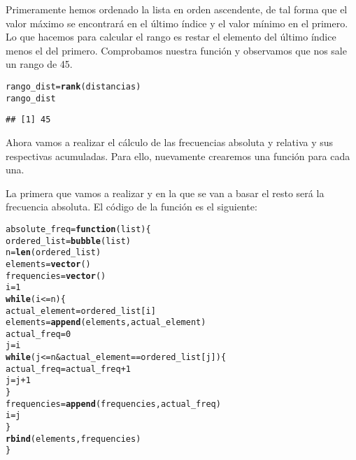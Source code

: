 \documentclass[12pt]{report}\usepackage[]{graphicx}\usepackage[dvipsnames]{xcolor}
\makeatletter
\newcommand{\hlnum}[1]{\textcolor[rgb]{0.686,0.059,0.569}{#1}}%
\newcommand{\hlopt}[1]{\textcolor[rgb]{0,0,0}{#1}}%
\newcommand{\hlstd}[1]{\textcolor[rgb]{0.345,0.345,0.345}{#1}}%
\newcommand{\hlkwa}[1]{\textcolor[rgb]{0.161,0.373,0.58}{\textbf{#1}}}%
\newcommand{\hlkwb}[1]{\textcolor[rgb]{0.69,0.353,0.396}{#1}}%
\newcommand{\hlkwc}[1]{\textcolor[rgb]{0.333,0.667,0.333}{#1}}%
\newcommand{\hlkwd}[1]{\textcolor[rgb]{0.737,0.353,0.396}{\textbf{#1}}}%
\newenvironment{kframe}{%
 \def\at@end@of@kframe{}%
 \ifinner\ifhmode%
  \def\at@end@of@kframe{\end{minipage}}%
  \begin{minipage}{\columnwidth}%
 \fi\fi%
 \def\FrameCommand##1{\hskip\@totalleftmargin \hskip-\fboxsep
 \colorbox{shadecolor}{##1}\hskip-\fboxsep
     \hskip-\linewidth \hskip-\@totalleftmargin \hskip\columnwidth}%
 \MakeFramed {\advance\hsize-\width
   \@totalleftmargin\z@ \linewidth\hsize
   \@setminipage}}%
 {\par\unskip\endMakeFramed%
 \at@end@of@kframe}
\newenvironment{knitrout}{}{} %
\makeatother
\begin{document}
			Primeramente hemos ordenado la lista en orden ascendente, de tal forma que el valor máximo se encontrará en el último índice y el valor mínimo en el primero. Lo que hacemos para calcular el rango es restar el elemento del último índice menos el del primero. Comprobamos nuestra función y observamos que nos sale un rango de 45.
			
\begin{knitrout}
\color{fgcolor}\begin{kframe}
\begin{alltt}
\hlstd{rango_dist} \hlkwb{=} \hlkwd{rank}\hlstd{(distancias)}
\hlstd{rango_dist}
\end{alltt}
\begin{verbatim}
## [1] 45
\end{verbatim}
\end{kframe}
\end{knitrout}
			
			Ahora vamos a realizar el cálculo de las frecuencias absoluta y relativa y sus respectivas acumuladas. Para ello, nuevamente crearemos una función para cada una. 
			
			La primera que vamos a realizar y en la que se van a basar el resto será la frecuencia absoluta. El código de la función es el siguiente:
			
\begin{knitrout}
\color{fgcolor}\begin{kframe}
\begin{alltt}
\hlstd{absolute_freq} \hlkwb{=} \hlkwa{function}\hlstd{(}\hlkwc{list}\hlstd{)\{}
        \hlstd{ordered_list} \hlkwb{=} \hlkwd{bubble}\hlstd{(list)}
        \hlstd{n} \hlkwb{=} \hlkwd{len}\hlstd{(ordered_list)}
        \hlstd{elements} \hlkwb{=} \hlkwd{vector}\hlstd{()}
        \hlstd{frequencies} \hlkwb{=} \hlkwd{vector}\hlstd{()}
        \hlstd{i} \hlkwb{=} \hlnum{1}
        \hlkwa{while} \hlstd{(i} \hlopt{<=} \hlstd{n)\{}
                \hlstd{actual_element} \hlkwb{=} \hlstd{ordered_list[i]}
                \hlstd{elements} \hlkwb{=} \hlkwd{append}\hlstd{(elements, actual_element)}
                \hlstd{actual_freq} \hlkwb{=} \hlnum{0}
                \hlstd{j} \hlkwb{=} \hlstd{i}
                \hlkwa{while}\hlstd{(j} \hlopt{<=} \hlstd{n} \hlopt{&} \hlstd{actual_element} \hlopt{==} \hlstd{ordered_list[j])\{}
                        \hlstd{actual_freq} \hlkwb{=} \hlstd{actual_freq} \hlopt{+} \hlnum{1}
                        \hlstd{j} \hlkwb{=} \hlstd{j}\hlopt{+}\hlnum{1}
                \hlstd{\}}
                \hlstd{frequencies} \hlkwb{=} \hlkwd{append}\hlstd{(frequencies, actual_freq)}
                \hlstd{i} \hlkwb{=} \hlstd{j}
        \hlstd{\}}
        \hlkwd{rbind}\hlstd{(elements, frequencies)}
\hlstd{\}}
\end{alltt}
\end{kframe}
\end{knitrout}
			
\end{document}

